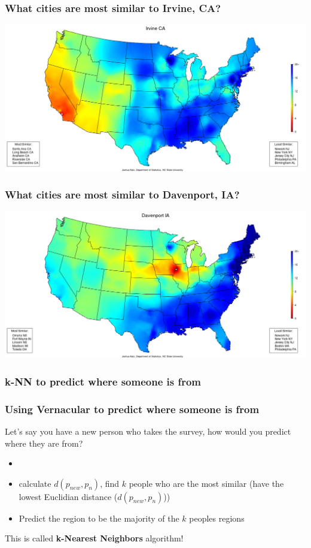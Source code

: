 \documentclass{beamer} %
\newcommand{\1}{\mathbb{1}}
\begin{document}
\begin{frame}[t]\frametitle{What cities are most similar to Irvine, CA?}    
\includegraphics[scale = 0.27]{./visualization/irvine.png}


\end{frame}

\begin{frame}[t]\frametitle{What cities are most similar to Davenport, IA?}    
\includegraphics[scale = 0.27]{./visualization/davenport.png}
\end{frame}


\subsubsection{k-NN to predict where someone is from}

\begin{frame}[t]\frametitle{Using Vernacular to predict where someone is from}    
	Let's say you have a new person who takes the survey, how would you predict where they are from?
	
	\pause

	\begin{itemize}
		\item[]
		\item calculate $d(p_{new}, p_n)$, find $k$ people who are the most similar (have the lowest Euclidian distance ($d(p_{new}, p_n)$))
		\item Predict the region to be the majority of the $k$ peoples regions
	\end{itemize}
	\vspace{5 mm}

	\pause
	This is called {\bf{k-Nearest Neighbors}} algorithm!
\end{frame}
\end{document}
